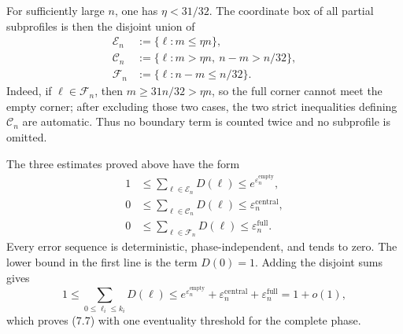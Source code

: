 
For sufficiently large $n$, one has $\eta<31/32$. The coordinate box of all
partial subprofiles is then the disjoint union of
\[
\begin{aligned}
  \mathcal E_n&:=\{\ell:m\le\eta n\},\\
  \mathcal C_n&:=\{\ell:m>\eta n,\ n-m>n/32\},\\
  \mathcal F_n&:=\{\ell:n-m\le n/32\}.
\end{aligned}
\]
Indeed, if $\ell\in\mathcal F_n$, then
$m\ge31n/32>\eta n$, so the full corner cannot meet the empty corner; after
excluding those two cases, the two strict inequalities defining
$\mathcal C_n$ are automatic. Thus no boundary term is counted twice and no
subprofile is omitted.

The three estimates proved above have the form
\[
\begin{aligned}
  1&\le\sum_{\ell\in\mathcal E_n}D(\ell)
      \le e^{\varepsilon_n^{\mathrm{empty}}},\\
  0&\le\sum_{\ell\in\mathcal C_n}D(\ell)
      \le\varepsilon_n^{\mathrm{central}},\\
  0&\le\sum_{\ell\in\mathcal F_n}D(\ell)
      \le\varepsilon_n^{\mathrm{full}}.
\end{aligned}
\]
Every error sequence is deterministic, phase-independent, and tends to zero.
The lower bound in the first line is the term $D(0)=1$. Adding the disjoint
sums gives
\[
  1
  \le
  \sum_{0\le\ell_i\le k_i}D(\ell)
  \le
  e^{\varepsilon_n^{\mathrm{empty}}}
  +\varepsilon_n^{\mathrm{central}}
  +\varepsilon_n^{\mathrm{full}}
  =1+o(1),
\]
which proves (7.7) with one eventuality threshold for the complete phase.
